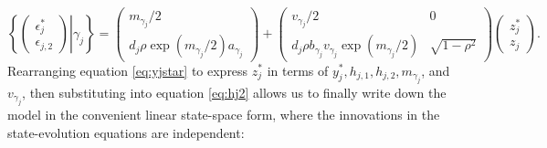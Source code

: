 \documentclass[10pt]{article}
\begin{document}
\begin{equation}
		\left\{ \left. \left( \begin{array}{c} \epsilon_{j}^{*} \\ \epsilon_{j,2} \end{array} \right) \right| \gamma_j \right\} = \left( \begin{array}{c} m_{\gamma_j}/2 \\ d_j \rho \exp(m_{\gamma_j}/2) a_{\gamma_j}  \end{array} \right) + \left( \begin{array}{cc} v_{\gamma_j}/2 & 0 \\ d_j \rho b_{\gamma_j} v_{\gamma_j} \exp(m_{\gamma_j}/2) & \sqrt{1-\rho^2}  \end{array} \right) \left( \begin{array}{c} z_j^* \\ z_j \end{array} \right).
\end{equation}
Rearranging equation \eqref{eq:yjstar} to express $z_j^*$ in terms of $y_j^*, h_{j,1}, h_{j,2}, m_{\gamma_j}$, and $v_{\gamma_j}$, then substituting into equation \eqref{eq:hj2} allows us to finally write down the model in the convenient linear state-space form, where the innovations in the state-evolution equations are independent:
\end{document}
